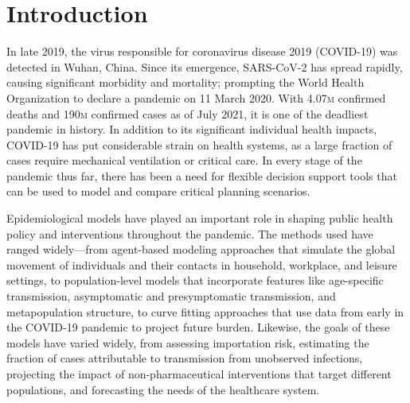 

\section{Introduction}

In late 2019, the virus responsible for coronavirus disease 2019 (COVID-19) was detected in Wuhan, China\cite{Zhu:NovelCoronavirusPatients:2020}. Since its emergence, SARS-CoV-2 has spread rapidly, causing significant morbidity and mortality; prompting the World Health Organization to declare a pandemic on 11 March 2020\cite{WHO:WHODirectorGeneralOpening}. With 4.07\textsc{m} confirmed deaths and 190\textsc{m} confirmed cases as of July 2021, it is one of the deadliest pandemic in history. In addition to its significant individual health impacts, COVID-19 has put considerable strain on health systems, as a large fraction of cases require mechanical ventilation or critical care\cite{Huang:ClinicalFeaturesPatients:2020}. In every stage of the pandemic thus far, there has been a need for flexible decision support tools that can be used to model and compare critical planning scenarios. 

Epidemiological models have played an important role in shaping public health policy and interventions throughout the pandemic. The methods used have ranged widely—from agent-based modeling approaches that simulate the global movement of individuals and their contacts in household, workplace, and leisure settings\cite{Ferguson:ReportImpactNonpharmaceutical:2020}, to population-level models that incorporate features like age-specific transmission, asymptomatic and presymptomatic transmission, and metapopulation structure\cite{Branas:FlatteningCurveIt:2020,Moghadas:ProjectingHospitalUtilization:2020,Davies:AgedependentEffectsTransmission:2020}, to curve fitting approaches that use data from early in the COVID-19 pandemic to project future burden\cite{IHMECOVID-19healthserviceutilizationforecastingteam:ForecastingImpactFirst:2020}. Likewise, the goals of these models have varied widely, from assessing importation risk, estimating the fraction of cases attributable to transmission from unobserved infections, projecting the impact of non-pharmaceutical interventions that target different populations, and forecasting the needs of the healthcare system. 

